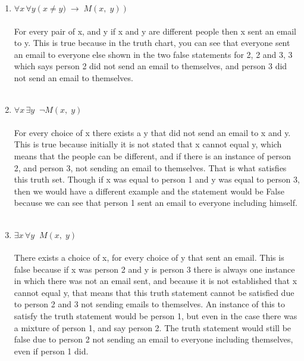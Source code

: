 \begin{enumerate}[label=(\alph*)]

\item $\forall x \, \forall y \left(x\not= y)\;\to \;  M(x,\;y)\right)$\\\\
For every pair of x, and y if x and y are different people then x sent an email to y. This is true because in the truth chart, you can see that everyone sent an email to everyone else shown in the two false statements for 2, 2 and 3, 3 which says person 2 did not send an email to themselves, and person 3 did not send an email to themselves.
\\\\

\item $\forall x \, \exists y \;\; \neg M(x,\;y)$\\\\
For every choice of x there exists a y that did not send an email to x and y.
This is true because initially it is not stated that x cannot equal y, which means that the people can be different, and if there is an instance of person 2, and person 3, not sending an email to themselves. That is what satisfies this truth set. Though if x was equal to person 1 and y was equal to person 3, then we would have a different example and the statement would be False because we can see that person 1 sent an email to everyone including himself.
\\\\
\item $\exists x \, \forall y \;\; M(x,\;y)$\\\\
There exists a choice of x, for every choice of y that sent an email. This is false because if x was person 2 and y is person 3 there is always one instance in which there was not an email sent, and because it is not established that x cannot equal y, that means that this truth statement cannot be satisfied due to person 2 and 3 not sending emails to themselves. An instance of this to satisfy the truth statement would be person 1, but even in the case there was a mixture of person 1, and say person 2. The truth statement would still be false due to person 2 not sending an email to everyone including themselves, even if person 1 did. 
\\\\
\end{enumerate}

